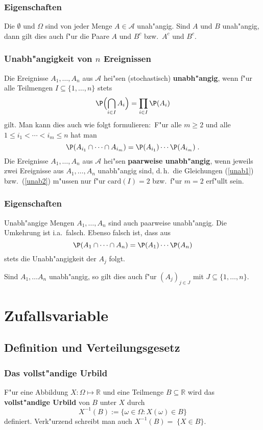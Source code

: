 \documentclass[ngerman,draft,parskip=half,twoside]{scrartcl}
\newcommand*{\R}{\mathbb{R}}      %
\newcommand*{\Algeb}{\mathcal{A}}   %
\begin{document}
\subsubsection{Eigenschaften}
Die $\emptyset$ und $\Omega$ sind von jeder Menge $A\in\Algeb$ unah"angig. Sind
$A$ und $B$ unah"angig, dann gilt dies auch f"ur die Paare $A$ und $B^c$ bzw.~$A^c$ und $B^c$.
\subsubsection{Unabh"angigkeit von $n$ Ereignissen}
Die Ereignisse $A_1,\ldots,A_n$ aus $\Algeb$ hei"sen (stochastisch) \textbf{unabh"angig},
wenn f"ur alle Teilmengen $I\subseteq\{1,\ldots,n\}$ stets
\begin{equation}
\label{unab1}
\P\Bigl(\bigcap_{i\in I} A_i\Bigr)= \prod_{i\in I}\P(A_i)
\end{equation}
gilt. Man kann dies auch wie folgt formulieren$\colon$ F"ur alle $m\ge 2$ und alle
$1\le i_1<\cdots<i_m\le n$ hat man
\begin{equation}
\label{unab2}
\P(A_{i_1}\cap\cdots\cap A_{i_m})= \P(A_{i_1})\cdots\P(A_{i_m})\;.
\end{equation}
Die Ereignisse $A_1,\ldots,A_n$ aus $\Algeb$ hei"sen \textbf{paarweise unabh"angig}, wenn
jeweils zwei Ereignisse aus $A_1,\ldots,A_n$ unabh"angig sind, d.\,h.~die Gleichungen
(\ref{unab1}) bzw.~(\ref{unab2}) m"ussen nur f"ur $\mathrm{card}(I)=2$ bzw.~f"ur $m=2$ erf"ullt sein.
\subsubsection{Eigenschaften}
Unabh"angige Mengen $A_1,\ldots,A_n$ sind auch paarweise unabh"angig. Die Umkehrung ist
i.a.~falsch. Ebenso falsch ist, dass aus
$$
\P(A_{1}\cap\cdots\cap A_{n})= \P(A_{1})\cdots\P(A_{n})
$$
stets die Unabh"angigkeit der $A_j$ folgt.

Sind $A_1,\ldots A_n$ unabh"angig, so gilt dies auch f"ur $(A_j)_{j\in J}$  mit
$J\subseteq \{1,\ldots,n\}$.

\section{Zufallsvariable}
\subsection{Definition und Verteilungsgesetz}

\subsubsection{Das vollst"andige Urbild}
F"ur eine Abbildung $X\colon\Omega\mapsto\R$ und eine Teilmenge $B\subseteq\R$ wird das
\textbf{vollst"andige Urbild} von $B$ unter $X$ durch
$$
X^{-1}(B):=\{\omega\in\Omega : X(\omega)\in B\}
$$
definiert. Verk"urzend schreibt man auch $X^{-1}(B)=\;\{X\in B\}$.
\end{document}
